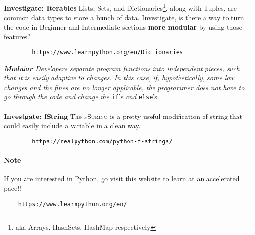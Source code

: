 \documentclass[12pt]{article}
\begin{document}
\textbf{Investigate: Iterables} Lists, Sets, and Dictionaries\footnote{aka Arrays, HashSets, HashMap respectively}, along with Tuples, are common data types to store a bunch of data. Investigate, is there a way to turn the code in Beginner and Intermediate sections \textbf{more modular} by using those features? \\ 
    \begin{verbatim}
        https://www.learnpython.org/en/Dictionaries
    \end{verbatim}
\textit{\textbf{Modular} Developers separate program functions into independent pieces, such that it is easily adaptive to changes. In this case, if, hypothetically, some law changes and the fines are no longer applicable, the programmer does not have to go through the code and change the} \verb|if|'s \textit{and} \verb|else|'s.\\ \\
\textbf{Investgate: fString} The \textsc{fString} is a pretty useful modification of string that could easily include a variable in a clean way.
    \begin{verbatim}
        https://realpython.com/python-f-strings/
    \end{verbatim}
    
\paragraph{Note} If you are interested in Python, go visit this website to learn at an accelerated pace!!
\begin{verbatim}
    https://www.learnpython.org/en/
\end{verbatim}
\end{document}
